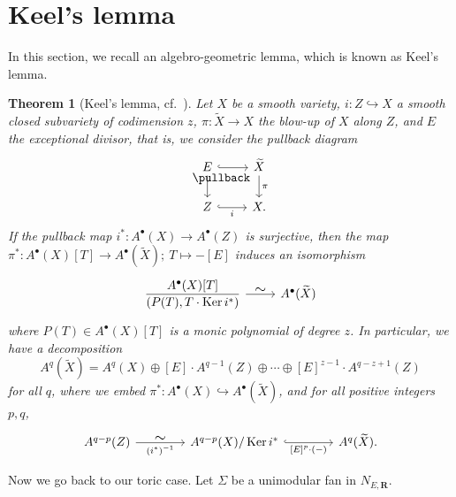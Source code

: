 \documentclass[a4paper,final,oneside]{amsart}
\theoremstyle{definition}
\theoremstyle{plain}
\newtheorem{theorem}[definition]{Theorem}
\theoremstyle{remark}
\DeclareMathOperator{\Ker}{Ker}
\begin{document}
\section{Keel's lemma}\label{sec_2}
In this section, we recall an algebro-geometric lemma, which is known as Keel's lemma.
\begin{theorem}[Keel's lemma, cf.\ {\cite[Appendix, Theorem 1]{Keel_92}}]\label{thm_1}
Let \(X\) be a smooth variety, \(i\colon Z\hookrightarrow X\) a smooth closed subvariety of codimension \(z\), \(\pi\colon \widetilde{X}\to X\) the blow-up of \(X\) along \(Z\), and \(E\) the exceptional divisor, that is, we consider the pullback diagram
\begin{equation}
\begin{tikzcd}
E \arrow[r,hook]\arrow[d]\arrow[rd,phantom,"\pullback",very near start]& \widetilde{X}\arrow[d,"\pi"]\\
Z\arrow[r,hook,"i"'] & X.
\end{tikzcd}
\end{equation}
If the pullback map \(i^*\colon A^{\bullet}(X) \to A^{\bullet}(Z)\) is surjective, then the map \(\pi^*\colon A^{\bullet}(X)[T]\to A^{\bullet}(\widetilde{X});\ T\mapsto -[E]\) induces an isomorphism 
\begin{equation}
\begin{tikzcd}
\displaystyle \frac{A^{\bullet}(X)[T]}{(P(T), T\cdot \Ker i^*)} \arrow[r,"\text{\large$\sim$}" yshift=-.3ex]& A^{\bullet}(\widetilde{X})
\end{tikzcd}
\end{equation}
where \(P(T) \in A^{\bullet}(X)[T]\) is a monic polynomial of degree \(z\).
In particular, we have a decomposition
\begin{equation}\label{eq_2}\tag{$\diamondsuit$}
A^q(\widetilde{X}) = A^q(X)\oplus [E]\cdot A^{q-1}(Z) \oplus\dotsb\oplus [E]^{z-1}\cdot A^{q-z+1}(Z)
\end{equation}
for all \(q\), where we embed \(\pi^*\colon A^{\bullet}(X) \hookrightarrow A^{\bullet}(\widetilde{X})\), and for all positive integers \(p,q\), 
\begin{equation}
\begin{tikzcd}[column sep = 4em]
A^{q-p}(Z)\arrow[r,"(i^*)^{-1}"',"\text{\large$\sim$}" yshift=-.3ex]& A^{q-p}(X)/\Ker i^* \arrow[r,hook,"{[E]^p\cdot(-)}"']& A^{q}(\widetilde{X}).
\end{tikzcd}
\end{equation}
\end{theorem}
Now we go back to our toric case.
Let \(\Sigma\) be a unimodular fan in \(N_{E,\symbf{R}}\).
\end{document}

